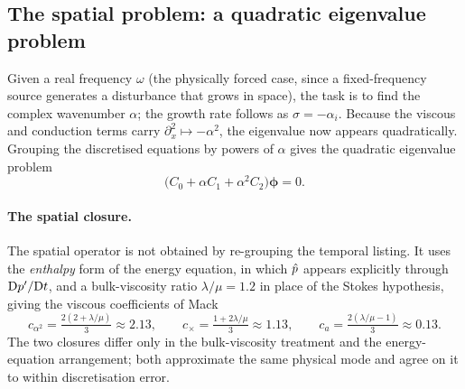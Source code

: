 \documentclass[11pt]{article}
\begin{document}
\subsection{The spatial problem: a quadratic eigenvalue problem}\label{sec:spatial}
Given a real frequency $\omega$ (the physically forced case, since a fixed-frequency source
generates a disturbance that grows in space), the task is to find the complex wavenumber $\alpha$;
the growth rate follows as $\sigma=-\alpha_i$. Because the viscous and conduction terms carry
$\partial_x^2\mapsto-\alpha^2$, the eigenvalue now appears quadratically. Grouping the discretised
equations by powers of $\alpha$ gives the quadratic eigenvalue problem
\begin{equation}\label{eq:qep}
  \big(C_0+\alpha C_1+\alpha^2C_2\big)\boldsymbol\phi=0 .
\end{equation}

\paragraph{The spatial closure.} The spatial operator is not obtained by re-grouping the temporal
listing. It uses the \emph{enthalpy} form of the energy equation, in which $\hat{p}$ appears
explicitly through $\mathrm{D} p'/\mathrm{D} t$, and a bulk-viscosity ratio $\lambda/\mu=1.2$ in place of the
Stokes hypothesis, giving the viscous coefficients of Mack \cite[Eq.~8.5]{mack1984}
\begin{equation}\label{eq:mackcoef}
  c_{\alpha^2}=\tfrac{2(2+\lambda/\mu)}{3}\approx2.13,\qquad
  c_\times=\tfrac{1+2\lambda/\mu}{3}\approx1.13,\qquad
  c_a=\tfrac{2(\lambda/\mu-1)}{3}\approx0.13 .
\end{equation}
The two closures differ only in the bulk-viscosity treatment and the energy-equation arrangement;
both approximate the same physical mode and agree on it to within discretisation error.
\end{document}
